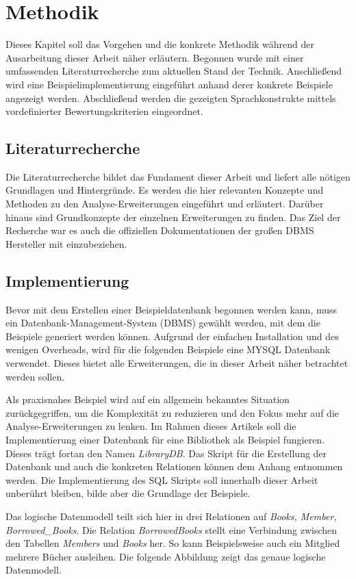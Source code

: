 \chapter{Methodik}
Dieses Kapitel soll das Vorgehen und die konkrete Methodik während der Ausarbeitung
dieser Arbeit näher erläutern. Begonnen wurde mit einer umfassenden
Literaturrecherche zum aktuellen Stand der Technik. Anschließend wird eine Beispielimplementierung
eingeführt anhand derer konkrete Beispiele angezeigt werden. Abschließend werden
die gezeigten Sprachkonstrukte mittels vordefinierter Bewertungskriterien
eingeordnet.

\section{Literaturrecherche}
Die Literaturrecherche bildet das Fundament dieser Arbeit und liefert alle
nötigen Grundlagen und Hintergründe. Es werden die hier relevanten Konzepte und Methoden
zu den Analyse-Erweiterungen eingeführt und erläutert. Darüber hinaus sind
Grundkonzepte der einzelnen Erweiterungen zu finden. Das Ziel der Recherche war es
auch die offiziellen Dokumentationen der großen DBMS Hersteller mit einzubeziehen.

\section{Implementierung}
Bevor mit dem Erstellen einer Beispieldatenbank begonnen werden kann, muss ein
Datenbank-Management-System (DBMS) gewählt werden, mit dem die Beispiele generiert
werden können. Aufgrund der einfachen Installation und des wenigen Overheads, wird
für die folgenden Beispiele eine MYSQL Datenbank verwendet. Dieses bietet alle
Erweiterungen, die in dieser Arbeit näher betrachtet werden sollen.

Als praxisnahes Beispiel wird auf ein allgemein bekanntes Situation zurückgegriffen,
um die Komplexität zu reduzieren und den Fokus mehr auf die Analyse-Erweiterungen
zu lenken. Im Rahmen dieses Artikels soll die Implementierung einer Datenbank für
eine Bibliothek als Beispiel fungieren. Dieses trägt fortan den Namen \textit{LibraryDB}.
Das Skript für die Erstellung der Datenbank und auch die konkreten Relationen
können dem Anhang entnommen werden. Die Implementierung des SQL Skripts soll innerhalb
dieser Arbeit unberührt bleiben, bilde aber die Grundlage der Beispiele.

Das logische Datenmodell teilt sich hier in drei Relationen auf \textit{Books, Member,
Borrowed\_Books}. Die Relation \textit{BorrowedBooks} stellt eine Verbindung zwischen
den Tabellen \textit{Members} und \textit{Books} her. So kann Beispielsweise
auch ein Mitglied mehrere Bücher ausleihen. Die folgende Abbildung zeigt das genaue
logische Datenmodell.

